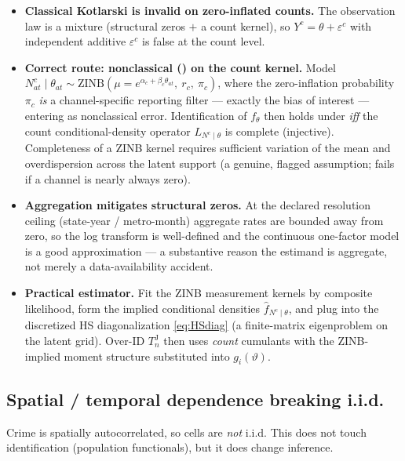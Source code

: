 \documentclass[11pt]{article}
\theoremstyle{definition}
\newcommand{\Th}{\theta}
\newcommand{\lat}{\Th}
\begin{document}
\begin{itemize}[leftmargin=1.4em]
\item \textbf{Classical Kotlarski is invalid on zero-inflated counts.} The
observation law is a mixture (structural zeros $+$ a count kernel), so
$Y^c=\lat+\varepsilon^c$ with independent additive $\varepsilon^c$ is false at
the count level.
\item \textbf{Correct route: nonclassical () on the count kernel.}
Model $N^c_{at}\mid\lat_{at}\sim\text{ZINB}(\mu=e^{\alpha_c+\beta_c\lat_{at}},
\ r_c,\ \pi_c)$, where the zero-inflation probability $\pi_c$ \emph{is} a
channel-specific reporting filter --- exactly the bias of interest --- entering
as nonclassical error. Identification of $f_\lat$ then holds under
 \emph{iff} the count conditional-density operator
$L_{N^c\mid\lat}$ is complete (injective). Completeness of a ZINB kernel
requires sufficient variation of the mean and overdispersion across the latent
support (a genuine, flagged assumption; fails if a channel is nearly always
zero).
\item \textbf{Aggregation mitigates structural zeros.} At the declared
resolution ceiling (state-year / metro-month) aggregate rates are bounded away
from zero, so the log transform is well-defined and the continuous one-factor
model is a good approximation --- a substantive reason the estimand is
aggregate, not merely a data-availability accident.
\item \textbf{Practical estimator.} Fit the ZINB measurement kernels by
composite likelihood, form the implied conditional densities
$\widehat f_{N^c\mid\lat}$, and plug into the discretized HS diagonalization
\eqref{eq:HSdiag} (a finite-matrix eigenproblem on the latent grid). Over-ID
$T_n^{\mathrm J}$ then uses \emph{count} cumulants with the ZINB-implied
moment structure substituted into $g_i(\vartheta)$.
\end{itemize}

\subsection{Spatial / temporal dependence breaking i.i.d.}\label{sec:spatial}

Crime is spatially autocorrelated, so cells are \emph{not} i.i.d. This does not
touch identification (population functionals), but it does change inference.
\end{document}
